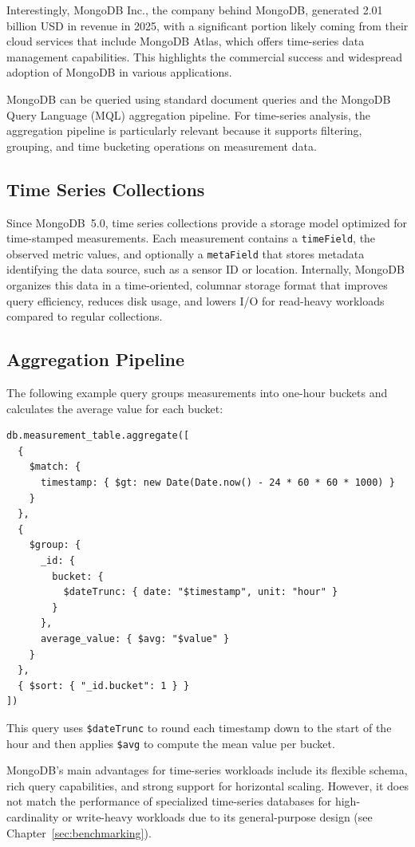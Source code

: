 Interestingly, MongoDB Inc., the company behind MongoDB, generated 2.01 billion
USD in revenue in 2025, with a significant portion likely coming from their
cloud services that include MongoDB Atlas, which offers time-series data
management capabilities. This highlights the commercial success and widespread
adoption of MongoDB in various applications.~\cite{MongoDB:05}

MongoDB can be queried using standard document queries and the MongoDB Query
Language (MQL) aggregation pipeline. For time-series analysis, the aggregation
pipeline is particularly relevant because it supports filtering, grouping, and
time bucketing operations on measurement data.~\cite{MongoDB:01}

\subsection{Time Series Collections}

Since MongoDB~5.0, time series collections provide a storage model optimized
for time-stamped measurements. Each measurement contains a \texttt{timeField},
the observed metric values, and optionally a \texttt{metaField} that stores
metadata identifying the data source, such as a sensor ID or location.
Internally, MongoDB organizes this data in a time-oriented, columnar storage
format that improves query efficiency, reduces disk usage, and lowers I/O for
read-heavy workloads compared to regular collections.~\cite{MongoDB:03}

\subsection{Aggregation Pipeline}

The following example query groups measurements into one-hour buckets and
calculates the average value for each bucket:

\begin{lstlisting}[caption={MongoDB aggregation query to aggregate data over time intervals.}, label={lst:mongodb-query}]
db.measurement_table.aggregate([
  {
    $match: {
      timestamp: { $gt: new Date(Date.now() - 24 * 60 * 60 * 1000) }
    }
  },
  {
    $group: {
      _id: {
        bucket: {
          $dateTrunc: { date: "$timestamp", unit: "hour" }
        }
      },
      average_value: { $avg: "$value" }
    }
  },
  { $sort: { "_id.bucket": 1 } }
])
\end{lstlisting}

This query uses \texttt{\$dateTrunc} to round each timestamp down to the start
of the hour and then applies \texttt{\$avg} to compute the mean value per
bucket.~\cite{MongoDB:04}

MongoDB's main advantages for time-series workloads include its flexible
schema, rich query capabilities, and strong support for horizontal scaling.
However, it does not match the performance of specialized time-series databases
for high-cardinality or write-heavy workloads due to its general-purpose design
(see Chapter~\ref{sec:benchmarking}).